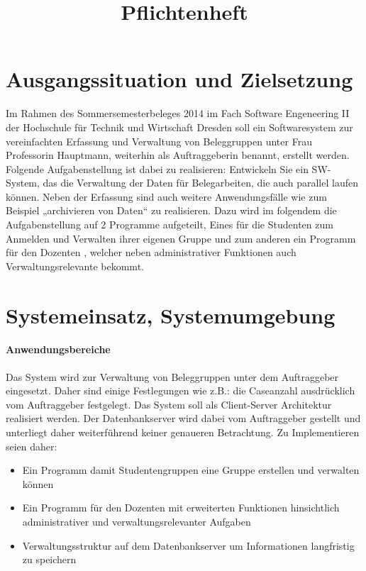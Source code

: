 \documentclass{article}
\title{Pflichtenheft}
\begin{document}
\maketitle
\newpage
\tableofcontents
\newpage

\part{Ausgangssituation und Zielsetzung}
Im Rahmen des Sommersemesterbeleges 2014 im Fach Software Engeneering II der Hochschule für Technik und Wirtschaft Dresden soll ein Softwaresystem zur vereinfachten Erfassung und Verwaltung von Beleggruppen unter Frau Professorin Hauptmann, weiterhin als Auftraggeberin benannt, erstellt werden.
Folgende Aufgabenstellung ist dabei zu realisieren:
Entwickeln  Sie ein SW-System, das die Verwaltung der Daten für Belegarbeiten, die auch parallel laufen können. Neben der Erfassung sind auch weitere Anwendungsfälle wie zum Beispiel „archivieren von Daten“ zu realisieren.
Dazu wird im folgendem die Aufgabenstellung auf 2 Programme aufgeteilt, Eines für die Studenten zum Anmelden und Verwalten ihrer eigenen Gruppe und zum anderen ein Programm für den Dozenten , welcher neben administrativer Funktionen auch Verwaltungsrelevante bekommt.

\newpage 
\part{Systemeinsatz, Systemumgebung}
\subsection{Anwendungsbereiche}
Das System wird zur Verwaltung von Beleggruppen unter dem Auftraggeber eingesetzt. Daher sind einige Festlegungen wie z.B.: die Caseanzahl ausdrücklich vom Auftraggeber festgelegt.
Das System soll als Client-Server Architektur realisiert werden. Der Datenbankserver wird dabei vom Auftraggeber gestellt und unterliegt daher weiterführend keiner genaueren Betrachtung. Zu Implementieren seien daher:
\begin{itemize}
\item Ein Programm damit Studentengruppen eine Gruppe erstellen und verwalten können
\item Ein Programm für den Dozenten mit erweiterten Funktionen hinsichtlich administrativer und verwaltungsrelevanter Aufgaben
\item Verwaltungsstruktur auf dem Datenbankserver um Informationen langfristig zu speichern
\end{itemize}
\end{document}
